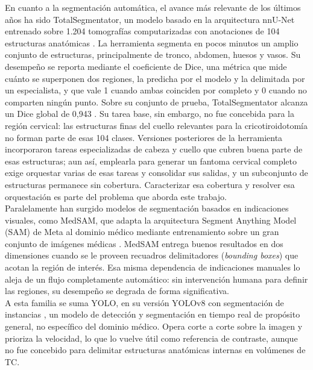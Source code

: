 En cuanto a la segmentación automática, el avance más relevante de los últimos años ha sido TotalSegmentator, un modelo basado en la arquitectura nnU-Net \citep{isensee2021nnunet} entrenado sobre 1.204 tomografías computarizadas con anotaciones de 104 estructuras anatómicas \citep{wasserthal2023totalsegmentator}. La herramienta segmenta en pocos minutos un amplio conjunto de estructuras, principalmente de tronco, abdomen, huesos y vasos. Su desempeño se reporta mediante el coeficiente de Dice, una métrica que mide cuánto se superponen dos regiones, la predicha por el modelo y la delimitada por un especialista, y que vale 1 cuando ambas coinciden por completo y 0 cuando no comparten ningún punto. Sobre su conjunto de prueba, TotalSegmentator alcanza un Dice global de 0,943 \citep{wasserthal2023totalsegmentator}. Su tarea base, sin embargo, no fue concebida para la región cervical: las estructuras finas del cuello relevantes para la cricotiroidotomía no forman parte de esas 104 clases. Versiones posteriores de la herramienta incorporaron tareas especializadas de cabeza y cuello que cubren buena parte de esas estructuras; aun así, emplearla para generar un fantoma cervical completo exige orquestar varias de esas tareas y consolidar sus salidas, y un subconjunto de estructuras permanece sin cobertura. Caracterizar esa cobertura y resolver esa orquestación es parte del problema que aborda este trabajo.\\

Paralelamente han surgido modelos de segmentación basados en indicaciones visuales, como MedSAM, que adapta la arquitectura Segment Anything Model (SAM) de Meta al dominio médico mediante entrenamiento sobre un gran conjunto de imágenes médicas \citep{ma2024medsam}. MedSAM entrega buenos resultados en dos dimensiones cuando se le proveen recuadros delimitadores (\textit{bounding boxes}) que acotan la región de interés. Esa misma dependencia de indicaciones manuales lo aleja de un flujo completamente automático: sin intervención humana para definir las regiones, su desempeño se degrada de forma significativa.\\

A esta familia se suma YOLO, en su versión YOLOv8 con segmentación de instancias \citep{jocher2023yolov8}, un modelo de detección y segmentación en tiempo real de propósito general, no específico del dominio médico. Opera corte a corte sobre la imagen y prioriza la velocidad, lo que lo vuelve útil como referencia de contraste, aunque no fue concebido para delimitar estructuras anatómicas internas en volúmenes de TC.\\

